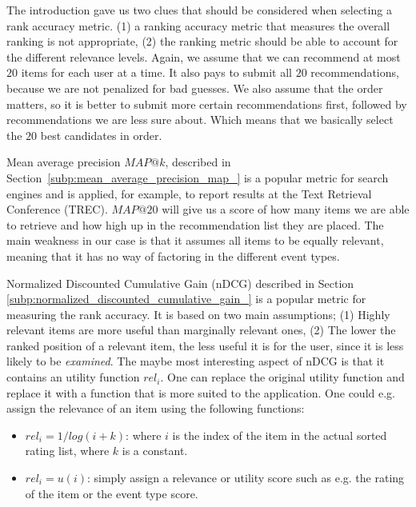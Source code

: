 The introduction gave us two clues that should be considered when selecting a rank accuracy metric.
(1) a ranking accuracy metric that measures the overall ranking is not appropriate, (2) the ranking
metric should be able to account for the different relevance levels.
Again, we assume that we can recommend at most $20$ items for each user at a time. It also pays to submit all $20$
recommendations, because we are not penalized for bad guesses. We also assume that the order matters, so it
is better to submit more certain recommendations first, followed by recommendations we are less sure about.
Which means that we basically select the $20$ best candidates in order. 


Mean average precision $MAP@k$, described in Section~\ref{subp:mean_average_precision_map_} is a popular metric for search
engines and is applied, for example, to report results at the Text Retrieval Conference (TREC). $MAP@20$ will give us a score
of how many items we are able to retrieve and how high up in the recommendation list they are placed. The main weakness in our
case is that it assumes all items to be equally relevant, meaning that it has no way of factoring in the different event types.

Normalized Discounted Cumulative Gain (nDCG) described in Section \ref{subp:normalized_discounted_cumulative_gain_} is a popular metric for
measuring the rank accuracy. It is based on two main assumptions; (1) Highly relevant items are more useful than marginally relevant ones,
(2) The lower the ranked position of a relevant item, the less useful it is for the user, since it is less likely to be \emph{examined}.
The maybe most interesting aspect of nDCG is that it contains an utility function $rel_i$. One can replace the original utility function
and replace it with a function that is more suited to the application. One could e.g. assign the relevance of an item using
the following functions:

\begin{itemize}
\item $rel_i = 1/log(i+k)$: where $i$ is the index of the item in the actual sorted rating list, where $k$ is a constant.
\item $rel_i = u(i)$: simply assign a relevance or utility score such as e.g. the rating of the item or the event type score.
\end{itemize}

